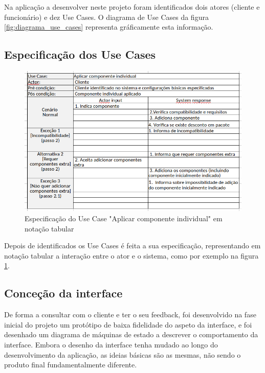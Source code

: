 \documentclass{llncs}
\newcommand\tab[1][0.5cm]{\hspace*{#1}}
\begin{document}
\tab Na aplicação a desenvolver neste projeto foram identificados dois atores (cliente e funcionário) e dez Use Cases. O diagrama de Use Cases da figura \ref{fig:diagrama_use_cases} representa gráficamente esta informação.

\subsection{Especificação dos Use Cases}

\begin{figure}
\begin{center}
\includegraphics[scale=0.40]{aplicar_componente_tabular.png} 
\end{center}
\caption{\label{fig:notacao_tabular}Especificação do Use Case "Aplicar componente individual" em notação tabular }
\end{figure} 

Depois de identificados os Use Cases é feita a sua especificação, representando em notação tabular a interação entre o ator e o sistema, como por exemplo na figura \ref{fig:notacao_tabular}.

\subsection{Conceção da interface}

De forma a consultar com o cliente e ter o seu feedback, foi desenvolvido na fase inicial do projeto um protótipo de baixa fidelidade do aspeto da interface, e foi desenhado um diagrama de máquinas de estado a descrever o comportamento da interface. Embora o desenho da interface tenha mudado ao longo do desenvolvimento da aplicação, as ideias básicas são as mesmas, não sendo o produto final fundamentalmente diferente.
\end{document}
